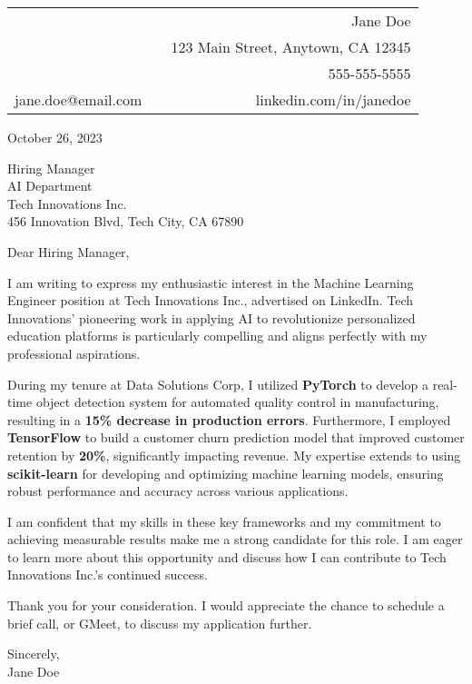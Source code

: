 \documentclass[11pt, letterpaper]{article}
\begin{document}
\begin{tabular*}{\textwidth}{@{\extracolsep{\fill}} llr}
  & & Jane Doe \\

  & & 123 Main Street, Anytown, CA 12345 \\

  & & 555-555-5555 \\

jane.doe@email.com & & linkedin.com/in/janedoe \\

\end{tabular*}

\vspace{0.3cm}

October 26, 2023

\vspace{0.5cm}

Hiring Manager \\

AI Department \\

Tech Innovations Inc. \\

456 Innovation Blvd, Tech City, CA 67890

\vspace{0.8cm}

Dear Hiring Manager,

\vspace{0.3cm}

I am writing to express my enthusiastic interest in the Machine Learning Engineer position at Tech Innovations Inc., advertised on LinkedIn. Tech Innovations' pioneering work in applying AI to revolutionize personalized education platforms is particularly compelling and aligns perfectly with my professional aspirations.

During my tenure at Data Solutions Corp, I utilized \textbf{PyTorch} to develop a real-time object detection system for automated quality control in manufacturing, resulting in a \textbf{15\% decrease in production errors}.  Furthermore, I employed \textbf{TensorFlow} to build a customer churn prediction model that improved customer retention by \textbf{20\%}, significantly impacting revenue. My expertise extends to using \textbf{scikit-learn} for developing and optimizing machine learning models, ensuring robust performance and accuracy across various applications.

I am confident that my skills in these key frameworks and my commitment to achieving measurable results make me a strong candidate for this role. I am eager to learn more about this opportunity and discuss how I can contribute to Tech Innovations Inc.'s continued success.

\vspace{0.3cm}

Thank you for your consideration.  I would appreciate the chance to schedule a brief call, or GMeet, to discuss my application further.

\vspace{0.5cm}

Sincerely, \\

Jane Doe
\end{document}
